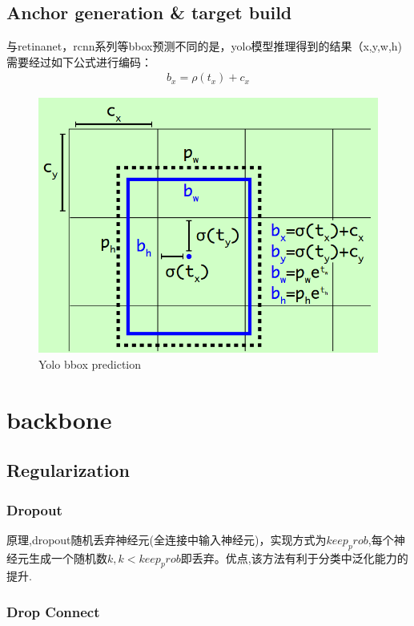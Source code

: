 \documentclass{article}
\begin{document}
\subsection{Anchor generation \& target build}
与retinanet，rcnn系列等bbox预测不同的是，yolo模型推理得到的结果（x,y,w,h)需要经过如下公式进行编码：
\begin{equation}
\begin{aligned}
b_x=\rho(t_x)+c_x
\end{aligned}
\end{equation}
\begin{figure}
\centering
\includegraphics[scale=0.5]{images/yolo_bbox.png}
\caption{Yolo bbox prediction}
\end{figure}

\section{backbone}
\subsection{Regularization}
\subsubsection{Dropout}
原理,dropout随机丢弃神经元(全连接中输入神经元)，实现方式为$keep_prob$,每个神经元生成一个随机数$k,k<keep_prob$即丢弃。优点,该方法有利于分类中泛化能力的提升.
\subsubsection{Drop Connect}
\end{document}

